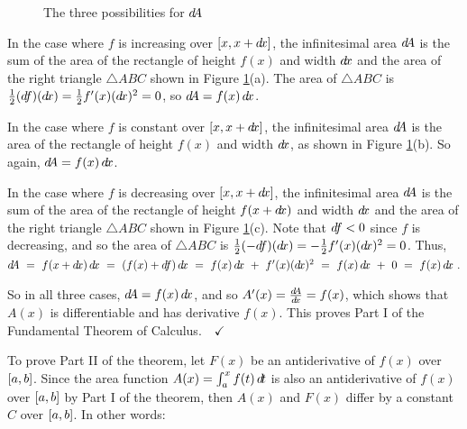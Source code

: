 \begin{figure}[ht]
{}
 \caption[]{\quad The three possibilities for $d\negmedspace A$}
 \label{fig:ftc1dA3}
\end{figure}

In the case where $f$ is increasing over $\lbrack x,x+d\!x \rbrack$, the infinitesimal
area $d\negmedspace A$ is the sum of the area of the rectangle of height $f(x)$ and width
$d\!x$ and the area of the right triangle $\triangle ABC$ shown in Figure
\ref{fig:ftc1dA3}(a). The area of $\triangle ABC$ is $\frac{1}{2}(d\negmedspace f)(d\!x)
= \frac{1}{2}f'(x)(d\!x)^2 = 0$, so $d\negmedspace A = f(x)\,d\!x$.

In the case where $f$ is constant over $\lbrack x,x+d\!x \rbrack$, the infinitesimal
area $d\negmedspace A$ is the area of the rectangle of height $f(x)$ and width $d\!x$, as
shown in Figure \ref{fig:ftc1dA3}(b). So again, $d\negmedspace A = f(x)\,d\!x$.

In the case where $f$ is decreasing over $\lbrack x,x+d\!x \rbrack$, the infinitesimal
area $d\negmedspace A$ is the sum of the area of the rectangle of height $f(x+d\!x)$ and
width $d\!x$ and the area of the right triangle $\triangle ABC$ shown in Figure
\ref{fig:ftc1dA3}(c). Note that $d\negmedspace f < 0$ since $f$ is decreasing, and so the
area of $\triangle ABC$ is $\frac{1}{2}(-d\negmedspace f)(d\!x) = -\frac{1}{2}f'(x)(d\!x)^2
= 0$. Thus,
$
\dA ~=\allowbreak~ f(x+\dx)\,\dx ~=\allowbreak~ (f(x) + \df)\,\dx ~=\allowbreak~
        f(x)\,\dx ~+~ f'(x)(\dx)^2 ~=\allowbreak~ f(x)\,\dx ~+~ 0 ~=\allowbreak~ f(x)\,\dx ~.
$

So in all three cases, $d\negmedspace A = f(x)\,d\!x$, and so $A'(x) = \frac{d\negmedspace A}{d\!x} = f(x)$,
which shows that $A(x)$ is differentiable and has derivative $f(x)$.
This proves Part I of the Fundamental Theorem of Calculus.$\quad\checkmark$

To prove Part II of the theorem, let $F(x)$ be an antiderivative of $f(x)$ over
$\lbrack a,b \rbrack$. Since the area function $A(x) = \int_a^x f(t)\,d\!t$ is also an
antiderivative of
$f(x)$ over $\lbrack a,b \rbrack$ by Part I of the theorem, then $A(x)$ and $F(x)$
differ by a constant $C$ over $\lbrack a,b \rbrack$. In other words:


